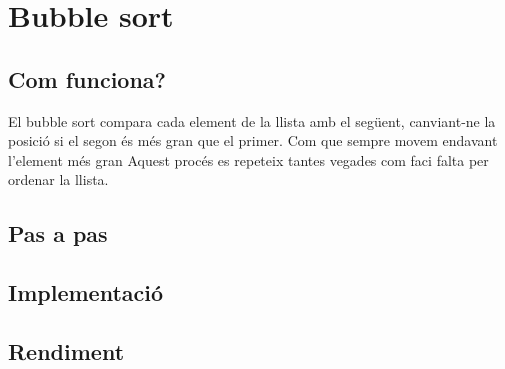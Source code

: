 \chapter{Bubble sort}

\section{Com funciona?}
El bubble sort compara cada element de la llista amb el següent, canviant-ne la posició si el segon és més gran que el primer.
Com que sempre movem endavant l'element més gran 
Aquest procés es repeteix tantes vegades com faci falta per ordenar la llista.

\section{Pas a pas}
\noindent
\makebox[\textwidth][c]{
}

\section{Implementació}


\begin{minipage}{\textwidth}
	\section{Rendiment}
	\noindent
	\makebox[\textwidth][c]{
		
		}
	\vspace*{1em}
	\begin{center}
		
	\end{center}
\end{minipage}